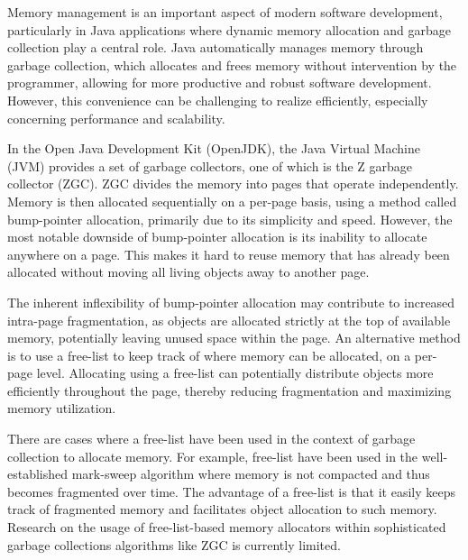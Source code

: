 
Memory management is an important aspect of modern software development, particularly in Java applications where dynamic memory allocation and garbage collection play a central role. Java automatically manages memory through garbage collection, which allocates and frees memory without intervention by the programmer, allowing for more productive and robust software development. However, this convenience can be challenging to realize efficiently, especially concerning performance and scalability. 

In the Open Java Development Kit (OpenJDK), the Java Virtual Machine (JVM) provides a set of garbage collectors, one of which is the Z garbage collector (ZGC). ZGC divides the memory into pages that operate independently. Memory is then allocated sequentially on a per-page basis, using a method called bump-pointer allocation, primarily due to its simplicity and speed. However, the most notable downside of bump-pointer allocation is its inability to allocate anywhere on a page. This makes it hard to reuse memory that has already been allocated without moving all living objects away to another page. 


The inherent inflexibility of bump-pointer allocation may contribute to increased intra-page fragmentation, as objects are allocated strictly at the top of available memory, potentially leaving unused space within the page. An alternative method is to use a free-list to keep track of where memory can be allocated, on a per-page level. Allocating using a free-list can potentially distribute objects more efficiently throughout the page, thereby reducing fragmentation and maximizing memory utilization.

There are cases where a free-list have been used in the context of garbage collection to allocate memory. For example, free-list have been used in the well-established mark-sweep algorithm where memory is not compacted and thus becomes fragmented over time. The advantage of a free-list is that it easily keeps track of fragmented memory and facilitates object allocation to such memory. Research on the usage of free-list-based memory allocators within sophisticated garbage collections algorithms like ZGC is currently limited.



